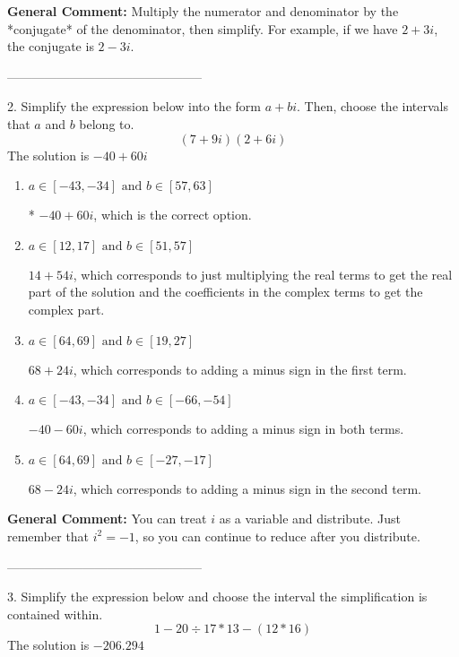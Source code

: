 \documentclass{extbook}[14pt]
\begin{document}
\textbf{General Comment:} Multiply the numerator and denominator by the *conjugate* of the denominator, then simplify. For example, if we have $2+3i$, the conjugate is $2-3i$. 

-----------------------------------------------

2. Simplify the expression below into the form $a+bi$. Then, choose the intervals that $a$ and $b$ belong to.
\[ (7 + 9 i)(2 + 6 i) \] 
The solution is $ -40 + 60 i $ 

\begin{enumerate}[label=\Alph*.] 
\item $ a \in [-43, -34] \text{ and } b \in [57, 63] $ 

 * $-40 + 60 i$, which is the correct option. 
\item $ a \in [12, 17] \text{ and } b \in [51, 57] $ 

  $14 + 54 i$, which corresponds to just multiplying the real terms to get the real part of the solution and the coefficients in the complex terms to get the complex part. 
\item $ a \in [64, 69] \text{ and } b \in [19, 27] $ 

  $68 + 24 i$, which corresponds to adding a minus sign in the first term. 
\item $ a \in [-43, -34] \text{ and } b \in [-66, -54] $ 

  $-40 - 60 i$, which corresponds to adding a minus sign in both terms. 
\item $ a \in [64, 69] \text{ and } b \in [-27, -17] $ 

  $68 - 24 i$, which corresponds to adding a minus sign in the second term. 
\end{enumerate} 
 
\textbf{General Comment:} You can treat $i$ as a variable and distribute. Just remember that $i^2=-1$, so you can continue to reduce after you distribute. 

-----------------------------------------------

3. Simplify the expression below and choose the interval the simplification is contained within.
\[ 1 - 20 \div 17 * 13 - (12 * 16) \] 
The solution is $ -206.294 $ 
\end{document}
